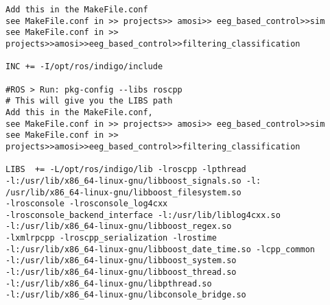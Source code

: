\begin{lstlisting}
Add this in the MakeFile.conf
see MakeFile.conf in >> projects>> amosi>> eeg_based_control>>sim
see MakeFile.conf in >> projects>>amosi>>eeg_based_control>>filtering_classification

INC += -I/opt/ros/indigo/include 

#ROS > Run: pkg-config --libs roscpp
# This will give you the LIBS path
Add this in the MakeFile.conf, 
see MakeFile.conf in >> projects>> amosi>> eeg_based_control>>sim
see MakeFile.conf in >> projects>>amosi>>eeg_based_control>>filtering_classification

LIBS  += -L/opt/ros/indigo/lib -lroscpp -lpthread 
-l:/usr/lib/x86_64-linux-gnu/libboost_signals.so -l:
/usr/lib/x86_64-linux-gnu/libboost_filesystem.so 
-lrosconsole -lrosconsole_log4cxx 
-lrosconsole_backend_interface -l:/usr/lib/liblog4cxx.so 
-l:/usr/lib/x86_64-linux-gnu/libboost_regex.so 
-lxmlrpcpp -lroscpp_serialization -lrostime 
-l:/usr/lib/x86_64-linux-gnu/libboost_date_time.so -lcpp_common 
-l:/usr/lib/x86_64-linux-gnu/libboost_system.so 
-l:/usr/lib/x86_64-linux-gnu/libboost_thread.so 
-l:/usr/lib/x86_64-linux-gnu/libpthread.so 
-l:/usr/lib/x86_64-linux-gnu/libconsole_bridge.so  

\end{lstlisting}

